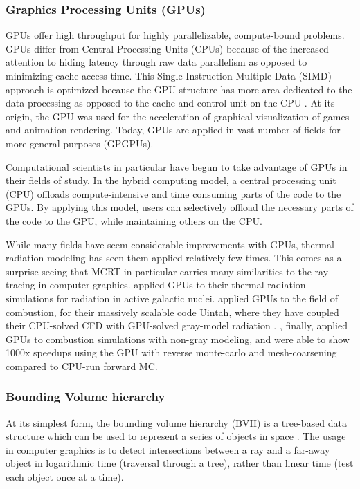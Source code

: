 \subsubsection{Graphics Processing Units (GPUs)}
GPUs offer high throughput for highly parallelizable, compute-bound problems.
GPUs differ from Central Processing Units (CPUs) because of the increased attention to hiding latency through raw data parallelism as opposed to minimizing cache access time. 
This Single Instruction Multiple Data (SIMD) approach is optimized because the GPU structure has more area dedicated to the data processing as opposed to the cache and control unit on the CPU \cite{Gupta2020CUDAComputing}.
At its origin, the GPU was used for the acceleration of graphical visualization of games and animation rendering. Today, GPUs are applied in vast number of fields for more general purposes (GPGPUs).

Computational scientists in particular have begun to take advantage of GPUs in their fields of study. In the hybrid computing model, a central processing unit (CPU) offloads compute-intensive and time consuming parts of the code to the GPUs.
By applying this model, users can selectively offload the necessary parts of the code to the GPU, while maintaining others on the CPU.

While many fields have seem considerable improvements with GPUs, thermal radiation modeling has seen them applied relatively few times. This comes as a surprise seeing that MCRT in particular carries many similarities to the ray-tracing in computer graphics.
\citet{Heymann2012GPU-basedAGN} applied GPUs to their thermal radiation simulations for radiation in active galactic nuclei.
\citet{Humphrey2012RadiationSystem} applied GPUs to the field of combustion, for their massively scalable code Uintah, where they have coupled their CPU-solved CFD with GPU-solved gray-model radiation \cite{Humphrey2015ATracingb,Humphrey2016RadiativeRefinement,Holmen2017ImprovingTasks,Peterson2018DemonstratingComputations}. 
\citet{Silvestri2019ASimulation}, finally, applied GPUs to combustion simulations with non-gray modeling, and were able to show 1000x speedups using the GPU with reverse monte-carlo and mesh-coarsening compared to CPU-run forward MC.

\subsubsection{Bounding Volume hierarchy}
At its simplest form, the bounding volume hierarchy (BVH) is a tree-based data structure which can be used to represent a series of objects in space \cite{Shirley2020RayWeek,Meister2021ATracing}. The usage in computer graphics is to detect intersections between a ray and a far-away object in logarithmic time (traversal through a tree), rather than linear time (test each object once at a time).

